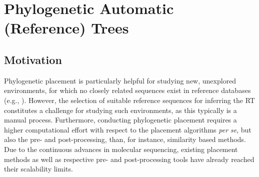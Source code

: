 
\chapter{Phylogenetic Automatic (Reference) Trees}
\label{ch:AutomaticTrees}



\section{Motivation}
\label{ch:AutomaticTrees:sec:Motivation}

Phylogenetic placement is particularly helpful for studying new, unexplored environments,
for which no closely related sequences exist in reference databases (e.g., \citealp{Mahe2017}).
However, the selection of suitable reference sequences for inferring the \ac{RT} constitutes
a challenge for studying such environments, as this typically is a manual process.
Furthermore, conducting phylogenetic placement requires a higher computational effort
with respect to the placement algorithms \emph{per se}, but also the pre- and post-processing,
than, for instance, similarity based methods.
Due to the continuous advances in molecular sequencing, existing placement methods
as well as respective pre- and post-processing tools have already reached their scalability limits.


